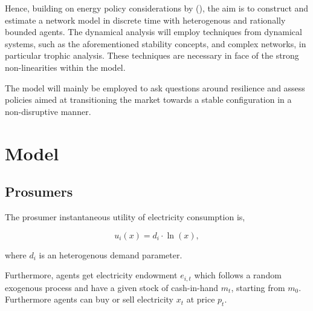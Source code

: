 \documentclass[american]{scrartcl}
\begin{document}
Hence, building on energy policy considerations by \citeauthor{Parag2016} (\citeyear{Parag2016}), the aim is to construct and estimate a network model in discrete time with heterogenous and rationally bounded agents. The dynamical analysis will employ techniques from dynamical systems, such as the aforementioned stability concepts, and complex networks, in particular trophic analysis. These techniques are necessary in face of the strong non-linearities within the model.

The model will mainly be employed to ask questions around resilience and assess policies aimed at transitioning the market towards a stable configuration in a non-disruptive manner.

\newpage
{} %
\printbibliography

\newpage
\appendix

\section{Model}

\subsection{Prosumers}

The prosumer instantaneous utility of electricity consumption is,

\begin{equation*}
    u_i(x) = d_i \cdot \ln(x),
\end{equation*}

where $d_i$ is an heterogenous demand parameter.

Furthermore, agents get electricity endowment $e_{i, t}$ which follows a random exogenous process and have a given stock of cash-in-hand $m_t$, starting from $m_0$. Furthermore agents can buy or sell electricity $x_t$ at price $p_t$.
\end{document}
